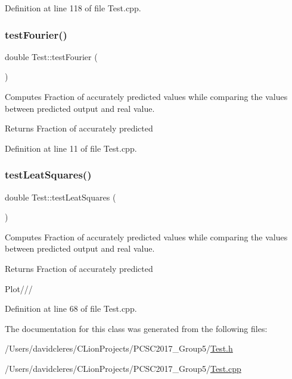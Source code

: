 Definition at line 118 of file Test.\+cpp.

\mbox{\label{class_test_a4789b9d0192ae0a3c6f88a7777a6bc57}} 
\subsubsection{\texorpdfstring{test\+Fourier()}{testFourier()}}
{\footnotesize\ttfamily double Test\+::test\+Fourier (\begin{DoxyParamCaption}{ }\end{DoxyParamCaption})}



Computes Fraction of accurately predicted values while comparing the values between predicted output and real value. 

\begin{DoxyReturn}{Returns}
Fraction of accurately predicted 
\end{DoxyReturn}


Definition at line 11 of file Test.\+cpp.

\mbox{\label{class_test_a78c56bbcd0b2406cbd06dc1a317b225b}} 
\subsubsection{\texorpdfstring{test\+Leat\+Squares()}{testLeatSquares()}}
{\footnotesize\ttfamily double Test\+::test\+Leat\+Squares (\begin{DoxyParamCaption}{ }\end{DoxyParamCaption})}



Computes Fraction of accurately predicted values while comparing the values between predicted output and real value. 

\begin{DoxyReturn}{Returns}
Fraction of accurately predicted 
\end{DoxyReturn}
Plot/// 

Definition at line 68 of file Test.\+cpp.



The documentation for this class was generated from the following files\+:\begin{DoxyCompactItemize}
\item 
/\+Users/davidcleres/\+C\+Lion\+Projects/\+P\+C\+S\+C2017\+\_\+\+Group5/\mbox{\hyperlink{_test_8h}{Test.\+h}}\item 
/\+Users/davidcleres/\+C\+Lion\+Projects/\+P\+C\+S\+C2017\+\_\+\+Group5/\mbox{\hyperlink{_test_8cpp}{Test.\+cpp}}\end{DoxyCompactItemize}
